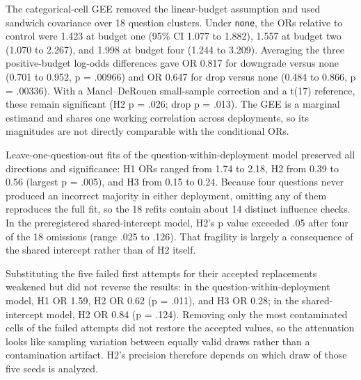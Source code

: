 \documentclass[11pt]{article}
\begin{document}
The categorical-cell GEE removed the linear-budget assumption and used sandwich covariance over 18 question clusters. Under \texttt{none}, the ORs relative to control were 1.423 at budget one (95\% CI 1.077 to 1.882), 1.557 at budget two (1.070 to 2.267), and 1.998 at budget four (1.244 to 3.209). Averaging the three positive-budget log-odds differences gave OR 0.817 for downgrade versus none (0.701 to 0.952, p = .00966) and OR 0.647 for drop versus none (0.484 to 0.866, p = .00336). With a Mancl–DeRouen small-sample correction and a t(17) reference, these remain significant (H2 p = .026; drop p = .013). The GEE is a marginal estimand and shares one working correlation across deployments, so its magnitudes are not directly comparable with the conditional ORs.

Leave-one-question-out fits of the question-within-deployment model preserved all directions and significance: H1 ORs ranged from 1.74 to 2.18, H2 from 0.39 to 0.56 (largest p = .005), and H3 from 0.15 to 0.24. Because four questions never produced an incorrect majority in either deployment, omitting any of them reproduces the full fit, so the 18 refits contain about 14 distinct influence checks. In the preregistered shared-intercept model, H2's p value exceeded .05 after four of the 18 omissions (range .025 to .126). That fragility is largely a consequence of the shared intercept rather than of H2 itself.

Substituting the five failed first attempts for their accepted replacements weakened but did not reverse the results: in the question-within-deployment model, H1 OR 1.59, H2 OR 0.62 (p = .011), and H3 OR 0.28; in the shared-intercept model, H2 OR 0.84 (p = .124). Removing only the most contaminated cells of the failed attempts did not restore the accepted values, so the attenuation looks like sampling variation between equally valid draws rather than a contamination artifact. H2's precision therefore depends on which draw of those five seeds is analyzed.
\end{document}
